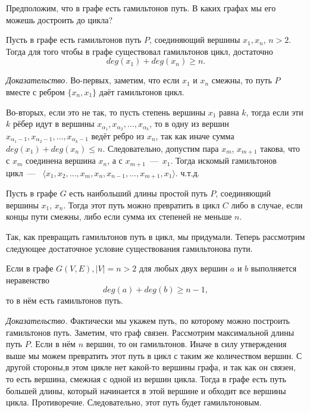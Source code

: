 	Предположим, что в графе есть гамильтонов путь. В каких графах мы его можешь достроить до цикла?
	
\begin{statement}
	Пусть в графе есть гамильтонов путь $P$, соединяющий вершины $x_1, x_n$, $n > 2$. Тогда для того чтобы в графе существовал гамильтонов цикл, достаточно $$deg(x_1)+deg(x_n) \geqslant n.$$
	
	\emph{Доказательство.} Во-первых, заметим, что если $x_1$ и $x_n$ смежны, то путь $P$ вместе с ребром $\lbrace x_n, x_1 \rbrace$ даёт гамильтонов цикл.
	
	Во-вторых, если это не так, то пусть степень вершины $x_1$ равна $k$, тогда если эти $k$ рёбер идут в вершины $x_{\alpha_1}, x_{\alpha_2}, \dots, x_{\alpha_k}$, то в одну из вершин $x_{\alpha_1 - 1}, x_{\alpha_2 - 1}, \dots, x_{\alpha_k - 1}$ ведёт ребро из $x_n$, так как иначе сумма $deg(x_1)+deg(x_n) \leqslant n$. Следовательно, допустим пара $x_m$, $x_{m+1}$ такова, что с $x_m$ соединена вершина $x_n$, а с $x_{m+1}$~---~$x_1$. Тогда искомый гамильтонов цикл~---~ $\langle x_1, x_2, \dots, x_m, x_n, x_{n-1}, \dots, x_{m+1}, x_1\rangle$. ч.т.д.
\end{statement}

\begin{consequence}
	Пусть в графе $G$ есть наибольший длины простой путь $P$, соединяющий вершины $x_1$, $x_n$. Тогда этот путь можно превратить в цикл $C$ либо в случае, если концы пути смежны, либо если сумма их степеней не меньше $n$.
\end{consequence}

	Так, как превращать гамильтонов путь в цикл, мы придумали. Теперь рассмотрим следующее достаточное условие существования гамильтонова пути.
	
\begin{theorem}[Оре]
	Если в графе $G(V, E), |V| = n > 2$ для любых двух вершин $a$ и $b$ выполняется неравенство 
	$$deg (a) + deg (b) \geqslant n-1,$$
	то в нём есть гамильтонов путь.
	
	\emph{Доказательство.} Фактически мы укажем путь, по которому можно построить гамильтонов путь. Заметим, что граф связен. Рассмотрим максимальной длины путь $P$. Если в нём $n$ вершин, то он гамильтонов. Иначе в силу утверждения выше мы можем превратить этот путь в цикл с таким же количеством вершин. С другой стороны,в этом цикле нет какой-то вершины графа, и так как он связен, то есть вершина, смежная с одной из вершин цикла. Тогда в графе есть путь большей длины, который начинается в этой вершине и обходит все вершины цикла. Противоречие. Следовательно, этот путь будет гамильтоновым.
\end{theorem}

